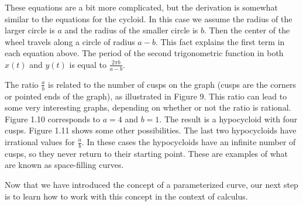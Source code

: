 \documentclass{report}
\begin{document}
    \bigbreak \noindent 
    These equations are a bit more complicated, but the derivation is somewhat similar to the equations for the cycloid. In this case we assume the radius of the larger circle is \( a \) and the radius of the smaller circle is \( b \). Then the center of the wheel travels along a circle of radius \( a - b \). This fact explains the first term in each equation above. The period of the second trigonometric function in both \( x(t) \) and \( y(t) \) is equal to \( \frac{2\pi b}{a - b} \).
    \bigbreak \noindent 
    \begin{minipage}[]{0.47\textwidth}
        The ratio \( \frac{a}{b} \) is related to the number of cusps on the graph (cusps are the corners or pointed ends of the graph), as illustrated in Figure 9. This ratio can lead to some very interesting graphs, depending on whether or not the ratio is rational. Figure 1.10 corresponds to \( a = 4 \) and \( b = 1 \). The result is a hypocycloid with four cusps. Figure 1.11 shows some other possibilities. The last two hypocycloids have irrational values for \( \frac{a}{b} \). In these cases the hypocycloids have an infinite number of cusps, so they never return to their starting point. These are examples of what are known as space-filling curves.
    \end{minipage}
    \hspace{.1in}
    \begin{minipage}[]{0.47\textwidth}
    \end{minipage}

    \pagebreak 
    \bigbreak \noindent 
    Now that we have introduced the concept of a parameterized curve, our next step is to learn how to work with this concept in the context of calculus.
    \bigbreak \noindent 
\end{document}
